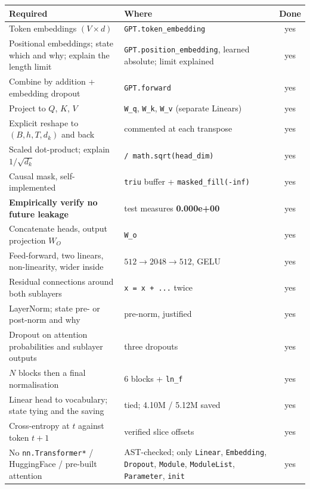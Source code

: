 \documentclass[11pt]{report}
\newcommand{\p}[1]{\texttt{#1}}
\begin{document}
\begin{center}
\begin{longtable}{p{}p{}c}
\toprule
\textbf{Required} & \textbf{Where} & \textbf{Done} \\
\midrule
\endhead
Token embeddings $(V \times d)$ & \p{GPT.token\_embedding} & yes \\
Positional embeddings; state which and why; explain the length limit &
\p{GPT.position\_embedding}, learned absolute; limit explained & yes \\
Combine by addition + embedding dropout & \p{GPT.forward} & yes \\
Project to $Q$, $K$, $V$ & \p{W\_q}, \p{W\_k}, \p{W\_v} (separate Linears) & yes \\
Explicit reshape to $(B,h,T,d_k)$ and back & commented at each transpose & yes \\
Scaled dot-product; explain $1/\sqrt{d_k}$ & \p{/ math.sqrt(head\_dim)} & yes \\
Causal mask, self-implemented & \p{triu} buffer + \p{masked\_fill(-inf)} & yes \\
\textbf{Empirically verify no future leakage} & test measures \textbf{0.000e+00} & yes \\
Concatenate heads, output projection $W_O$ & \p{W\_o} & yes \\
Feed-forward, two linears, non-linearity, wider inside & $512\to2048\to512$, GELU & yes \\
Residual connections around both sublayers & \p{x = x + ...} twice & yes \\
LayerNorm; state pre- or post-norm and why & pre-norm, justified & yes \\
Dropout on attention probabilities and sublayer outputs & three dropouts & yes \\
$N$ blocks then a final normalisation & 6 blocks + \p{ln\_f} & yes \\
Linear head to vocabulary; state tying and the saving & tied; 4.10M / 5.12M saved & yes \\
Cross-entropy at $t$ against token $t{+}1$ & verified slice offsets & yes \\
No \p{nn.Transformer*} / HuggingFace / pre-built attention & AST-checked; only
\p{Linear}, \p{Embedding}, \p{Dropout}, \p{Module}, \p{ModuleList},
\p{Parameter}, \p{init} & yes \\
\bottomrule
\end{longtable}
\end{center}
\end{document}
